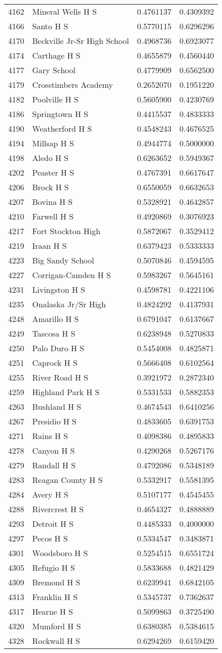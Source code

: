 \documentclass[
]{article}
\begin{document}
\begin{longtable}[]{@{}llrr@{}}
4162 & Mineral Wells H S & 0.4761137 & 0.4309392\tabularnewline
4166 & Santo H S & 0.5770115 & 0.6296296\tabularnewline
4170 & Beckville Jr-Sr High School & 0.4968736 &
0.6923077\tabularnewline
4174 & Carthage H S & 0.4655879 & 0.4560440\tabularnewline
4177 & Gary School & 0.4779909 & 0.6562500\tabularnewline
4179 & Crosstimbers Academy & 0.2652070 & 0.1951220\tabularnewline
4182 & Poolville H S & 0.5605900 & 0.4230769\tabularnewline
4186 & Springtown H S & 0.4415537 & 0.4833333\tabularnewline
4190 & Weatherford H S & 0.4548243 & 0.4676525\tabularnewline
4194 & Millsap H S & 0.4944774 & 0.5000000\tabularnewline
4198 & Aledo H S & 0.6263652 & 0.5949367\tabularnewline
4202 & Peaster H S & 0.4767391 & 0.6617647\tabularnewline
4206 & Brock H S & 0.6550059 & 0.6632653\tabularnewline
4207 & Bovina H S & 0.5328921 & 0.4642857\tabularnewline
4210 & Farwell H S & 0.4920869 & 0.3076923\tabularnewline
4217 & Fort Stockton High & 0.5872067 & 0.3529412\tabularnewline
4219 & Iraan H S & 0.6379423 & 0.5333333\tabularnewline
4223 & Big Sandy School & 0.5070846 & 0.4594595\tabularnewline
4227 & Corrigan-Camden H S & 0.5983267 & 0.5645161\tabularnewline
4231 & Livingston H S & 0.4598781 & 0.4221106\tabularnewline
4235 & Onalaska Jr/Sr High & 0.4824292 & 0.4137931\tabularnewline
4248 & Amarillo H S & 0.6791047 & 0.6137667\tabularnewline
4249 & Tascosa H S & 0.6238948 & 0.5270833\tabularnewline
4250 & Palo Duro H S & 0.5454008 & 0.4825871\tabularnewline
4251 & Caprock H S & 0.5666408 & 0.6102564\tabularnewline
4255 & River Road H S & 0.3921972 & 0.2872340\tabularnewline
4259 & Highland Park H S & 0.5331533 & 0.5882353\tabularnewline
4263 & Bushland H S & 0.4674543 & 0.6410256\tabularnewline
4267 & Presidio H S & 0.4833605 & 0.6391753\tabularnewline
4271 & Rains H S & 0.4098386 & 0.4895833\tabularnewline
4278 & Canyon H S & 0.4290268 & 0.5267176\tabularnewline
4279 & Randall H S & 0.4792086 & 0.5348189\tabularnewline
4283 & Reagan County H S & 0.5332917 & 0.5581395\tabularnewline
4284 & Avery H S & 0.5107177 & 0.4545455\tabularnewline
4288 & Rivercrest H S & 0.4654327 & 0.4888889\tabularnewline
4293 & Detroit H S & 0.4485333 & 0.4000000\tabularnewline
4297 & Pecos H S & 0.5334547 & 0.3483871\tabularnewline
4301 & Woodsboro H S & 0.5254515 & 0.6551724\tabularnewline
4305 & Refugio H S & 0.5833688 & 0.4821429\tabularnewline
4309 & Bremond H S & 0.6239941 & 0.6842105\tabularnewline
4313 & Franklin H S & 0.5345737 & 0.7362637\tabularnewline
4317 & Hearne H S & 0.5099863 & 0.3725490\tabularnewline
4320 & Mumford H S & 0.6380385 & 0.5384615\tabularnewline
4328 & Rockwall H S & 0.6294269 & 0.6159420\tabularnewline

\end{longtable}
\end{document}
